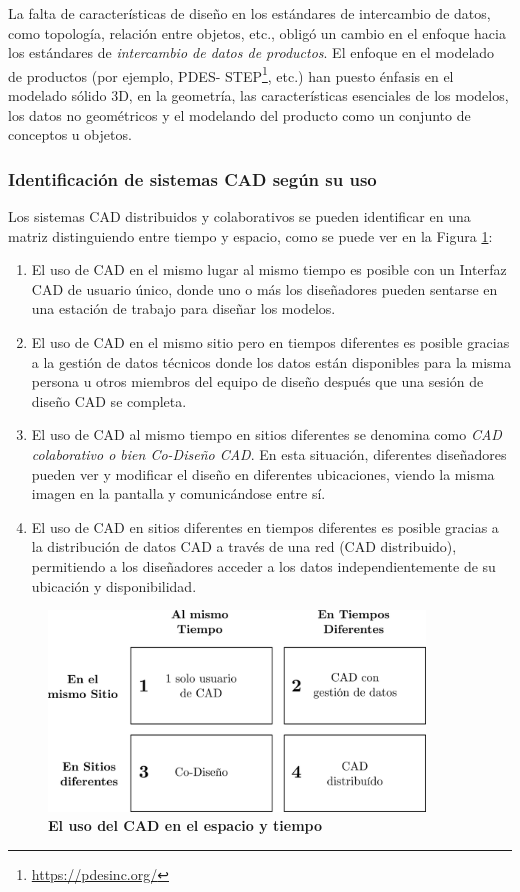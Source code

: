 La falta de características de diseño en los estándares de intercambio de datos, como topología, relación entre objetos, etc., obligó un cambio en el enfoque hacia los estándares de \textit{intercambio de datos de productos}. El enfoque en el modelado de productos (por ejemplo, PDES- STEP\footnote{\url{https://pdesinc.org/}}, etc.) han puesto énfasis en el modelado sólido 3D, en la geometría, las características esenciales de los modelos, los datos no geométricos y el modelando del producto como un conjunto de conceptos u objetos.

\subsubsection{Identificación de sistemas CAD según su uso}
Los sistemas CAD distribuidos y colaborativos se pueden identificar en una matriz distinguiendo entre tiempo y espacio, como se puede ver en la Figura \ref{fig:tablacad}:

\begin{enumerate}
\item El uso de CAD en el mismo lugar al mismo tiempo es posible con un Interfaz CAD de usuario único, donde uno o más los diseñadores pueden sentarse en una estación de trabajo para diseñar los modelos.
\item El uso de CAD en el mismo sitio pero en tiempos diferentes es posible gracias a la gestión de datos técnicos donde los datos están disponibles para la misma persona u otros miembros del equipo de diseño después que una sesión de diseño CAD se completa.
\item El uso de CAD al mismo tiempo en sitios diferentes se denomina como
\textit{CAD colaborativo o bien Co-Diseño CAD}. En esta situación, diferentes diseñadores pueden ver y modificar el diseño en diferentes ubicaciones, viendo la misma imagen en la pantalla y comunicándose entre sí.
\item El uso de CAD en sitios diferentes en tiempos diferentes es posible gracias a la distribución de datos CAD a través de una red (CAD distribuido), permitiendo a los diseñadores acceder a los datos independientemente de su ubicación y disponibilidad.
\end{enumerate}


\begin{figure}[h]
\includegraphics[width=10cm]{Img/CPD/cad-time.png}
\centering
\caption{\textbf{\footnotesize{El uso del CAD en el espacio y tiempo}}}
\label{fig:tablacad}
\end{figure}


